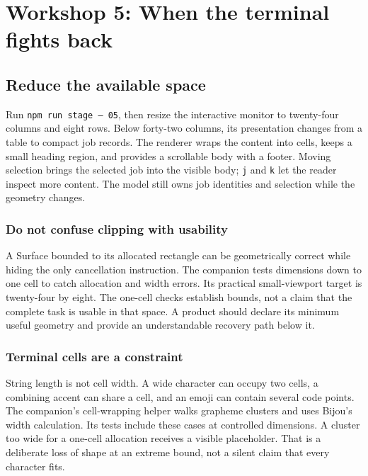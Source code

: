 \chapter{Workshop 5: When the terminal fights back}\label{workshop-05}

\section{Reduce the available space}

Run \texttt{npm run stage -- 05}, then resize the interactive monitor to twenty-four columns and eight rows. Below forty-two columns, its presentation changes from a table to compact job records. The renderer wraps the content into cells, keeps a small heading region, and provides a scrollable body with a footer. Moving selection brings the selected job into the visible body; \texttt{j} and \texttt{k} let the reader inspect more content. The model still owns job identities and selection while the geometry changes.

\subsection{Do not confuse clipping with usability}

A Surface bounded to its allocated rectangle can be geometrically correct while hiding the only cancellation instruction. The companion tests dimensions down to one cell to catch allocation and width errors. Its practical small-viewport target is twenty-four by eight. The one-cell checks establish bounds, not a claim that the complete task is usable in that space. A product should declare its minimum useful geometry and provide an understandable recovery path below it.

\subsection{Terminal cells are a constraint}

String length is not cell width. A wide character can occupy two cells, a combining accent can share a cell, and an emoji can contain several code points. The companion's cell-wrapping helper walks grapheme clusters and uses Bijou's width calculation. Its tests include these cases at controlled dimensions. A cluster too wide for a one-cell allocation receives a visible placeholder. That is a deliberate loss of shape at an extreme bound, not a silent claim that every character fits.


